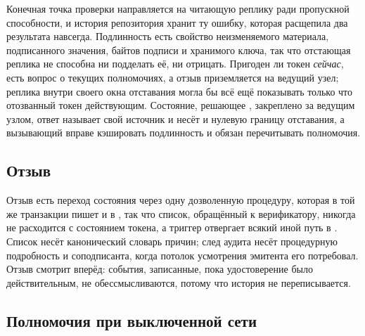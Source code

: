 Конечная точка проверки направляется на читающую реплику ради пропускной способности, и история
репозитория хранит ту ошибку, которая расщепила два результата навсегда. Подлинность есть свойство
неизменяемого материала, подписанного значения, байтов подписи и хранимого ключа, так что
отстающая реплика не способна ни подделать её, ни отрицать. Пригоден ли токен \emph{сейчас}, есть
вопрос о текущих полномочиях, а отзыв приземляется на ведущий узел; реплика внутри своего окна
отставания могла бы всё ещё показывать только что отозванный токен действующим.
Состояние, решающее , закреплено за ведущим узлом, ответ называет свой
источник и несёт  и нулевую границу отставания, а вызывающий вправе кэшировать
подлинность и обязан перечитывать полномочия. \sImpl

\subsection{Отзыв}

Отзыв есть переход состояния через одну дозволенную процедуру, которая в той же транзакции пишет и
в , так что список, обращённый к верификатору, никогда не расходится с
состоянием токена, а триггер отвергает всякий иной путь в . Список несёт канонический
словарь причин; след аудита несёт процедурную подробность и соподписанта, когда потолок усмотрения
эмитента его потребовал. Отзыв смотрит вперёд: события, записанные, пока удостоверение было
действительным, не обессмысливаются, потому что история не переписывается. \sImpl

\subsection{Полномочия при выключенной сети}


